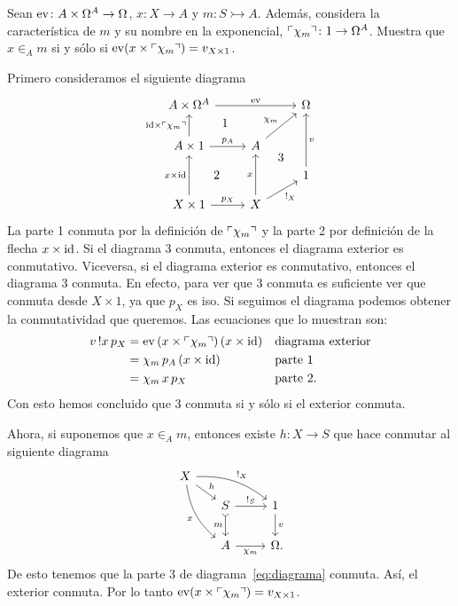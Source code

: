 \begin{exercise}[par=2,teca=2]
  Sean \(\mathrm{ev}\colon A\times\Omega^A\to\Omega\), \(x\colon X\to A\) y 
  \(m\colon S\rightarrowtail A\). Además, considera la característica de \(m\) y
  su nombre en la exponencial, \(\ulcorner\chi_m\urcorner\colon 1\to\Omega^A\). Muestra que 
  \(x\in_A m\) si y sólo si \(\mathrm{ev}(x\times\ulcorner\chi_m\urcorner) = v_{X\times 1}\).
\end{exercise}
\begin{solution}[print=true]
  Primero consideramos el siguiente diagrama
  \begin{equation}\label{eq:diagrama}
    \begin{tikzcd}[ampersand replacement=\&]
      A\times\Omega^A\ar{rr}{\ev} \&\& \Omega\\
      A\times 1\ar{u}{\id\times\name{\chi_m}}[name=a]{}\ar{r}{p_A}
      \& A\ar{ru}[name=b]{\chi_m} \\[-2ex]
      \&\& 1\ar{uu}[swap,name=y]{v} \\[-2ex]
      X\times 1\ar{uu}{x\times\id}[name=xid]{}\ar{r}{p_X}
      \& X\ar{uu}[name=x]{x}\ar{ur}[swap]{!_X}
      \ar[phantom, from=a, to=b, "1"]
      \ar[phantom, from=xid, to=x, "2"]
      \ar[phantom, from=x, to=y, "3"]
    \end{tikzcd}
  \end{equation}
  La parte 1 conmuta por la definición de \(\ulcorner\chi_m\urcorner\) y la parte 2 por
  definición de la flecha \(x\times\mathrm{id}\). Si el diagrama 3 conmuta, entonces el
  diagrama exterior es conmutativo. Viceversa, si el diagrama exterior es
  conmutativo, entonces el diagrama 3 conmuta. En efecto, para ver que 3 conmuta
  es suficiente ver que conmuta desde \(X\times 1\), ya que \(p_X\) es iso. Si
  seguimos el diagrama podemos obtener la conmutatividad que queremos. Las
  ecuaciones que lo muestran son:
  \begin{align*}
    v\,!x\,p_X &= \mathrm{ev}\,(x\times\ulcorner\chi_m\urcorner)\,(x\times\mathrm{id})
    && \text{diagrama exterior}\\
    & = \chi_m\,p_A\,(x\times\mathrm{id}) && \text{parte 1}\\
    &= \chi_m\,x\,p_X && \text{parte 2.}
  \end{align*} 
  Con esto hemos concluido que 3 conmuta si y sólo si el exterior conmuta.

  Ahora, si suponemos que \(x\in_A m\), entonces existe \(h\colon X\to S\) que
  hace conmutar al siguiente diagrama
  \begin{equation}\label{eq:defchi}
    \begin{tikzcd}[ampersand replacement=\&]
      X\ar[bend left=20]{rrd}{!_X}\ar[bend right=20]{ddr}[swap]{x}
        \ar{rd}{h}\\[-2ex]
      \&[-2ex] S\ar{r}{!_S}\ar[tail]{d}[swap]{m} \& 1\ar{d}{v}\\
      \& A\ar{r}[swap]{\chi_m} \& \Omega\mathrlap{.}
    \end{tikzcd}
  \end{equation}
  De esto tenemos que la parte 3 de diagrama~\eqref{eq:diagrama} conmuta. Así, el
  exterior conmuta. Por lo tanto \(\mathrm{ev}(x\times\ulcorner\chi_m\urcorner)=v_{X\times 1}\).
  

\end{solution}
